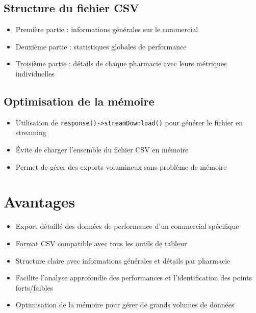\documentclass[12pt,a4paper]{article}
\begin{document}
\subsection{Structure du fichier CSV}
\begin{itemize}
    \item Première partie : informations générales sur le commercial
    \item Deuxième partie : statistiques globales de performance
    \item Troisième partie : détails de chaque pharmacie avec leurs métriques individuelles
\end{itemize}

\subsection{Optimisation de la mémoire}
\begin{itemize}
    \item Utilisation de \texttt{response()->streamDownload()} pour générer le fichier en streaming
    \item Évite de charger l'ensemble du fichier CSV en mémoire
    \item Permet de gérer des exports volumineux sans problème de mémoire
\end{itemize}

\section{Avantages}
\begin{itemize}
    \item Export détaillé des données de performance d'un commercial spécifique
    \item Format CSV compatible avec tous les outils de tableur
    \item Structure claire avec informations générales et détails par pharmacie
    \item Facilite l'analyse approfondie des performances et l'identification des points forts/faibles
    \item Optimisation de la mémoire pour gérer de grands volumes de données
\end{itemize}
\end{document}
